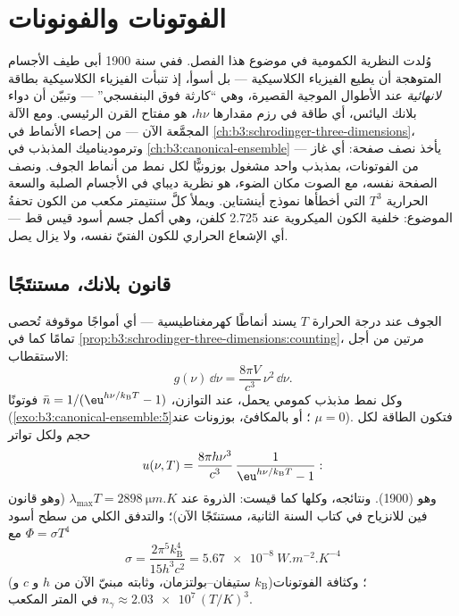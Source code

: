 \chapter{الفوتونات والفونونات}\label{ch:b3:photons-phonons}

وُلدت النظرية الكمومية في موضوع هذا الفصل. ففي سنة 1900 أبى
طيف الأجسام المتوهجة أن يطيع الفيزياء الكلاسيكية ---
بل أسوأ، إذ تنبأت الفيزياء الكلاسيكية بطاقة \emph{لانهائية} عند
الأطوال الموجية القصيرة، وهي ``كارثة فوق البنفسجي'' --- وتبيّن أن دواء بلانك
اليائس، أي طاقة في رزم مقدارها $h\nu$، هو
مفتاح القرن الرئيسي. ومع الآلة المجمَّعة الآن --- من إحصاء
الأنماط في \cref{ch:b3:schrodinger-three-dimensions}، وترموديناميك
المذبذب في \cref{ch:b3:canonical-ensemble} --- يأخذ 
نصف صفحة: أي غاز من الفوتونات، بمذبذب واحد مشغول بوزونيًّا
لكل نمط من أنماط الجوف. ونصف الصفحة نفسه، مع الصوت مكان الضوء،
هو نظرية ديباي في الأجسام الصلبة والسعة الحرارية $T^3$ التي أخطأها
نموذج أينشتاين. ويملأ كلَّ سنتيمتر مكعب من الكون
تحفةُ الموضوع: خلفية الكون الميكروية عند 2.725 كلفن،
وهي أكمل جسم أسود قيس قط --- أي
الإشعاع الحراري للكون الفتيّ نفسه، ولا يزال يصل.

\section{قانون بلانك، مستنتَجًا}

\begin{theorem}\label{thm:b3:photons-phonons:planck}
الجوف عند درجة الحرارة $T$ يسند أنماطًا كهرمغناطيسية ---
أي أمواجًا موقوفة تُحصى تمامًا كما في
\cref{prop:b3:schrodinger-three-dimensions:counting}، مرتين من أجل
الاستقطاب:
\[
g(\nu)\,\dd\nu = \frac{8\pi V}{c^3}\,\nu^2\,\dd\nu .
\]
وكل نمط مذبذب كمومي يحمل، عند التوازن،
$\bar n = 1/(\eu^{h\nu/k_{\text{B}}T} - 1)$ فوتونًا
(\cref{exo:b3:canonical-ensemble:5}؛ أو بالمكافئ، بوزونات عند $\mu =
0$). فتكون الطاقة لكل حجم ولكل تواتر
\[
u(\nu, T) = \frac{8\pi h\nu^3}{c^3}\,
\frac{1}{\eu^{h\nu/k_{\text{B}}T} - 1} :
\]
وهو \emph{} (1900). ونتائجه، وكلها كما قيست:
الذروة عند $\lambda_{\max}T = \qty{2898}{\micro m.K}$ (وهو قانون
فين للانزياح في كتاب السنة الثانية، مستنتَجًا الآن)؛ والتدفق الكلي
من سطح أسود $\Phi = \sigma T^4$ مع
\[
\sigma = \frac{2\pi^5k_{\text{B}}^4}{15h^3c^2}
 = \qty{5.67e-8}{W.m^{-2}.K^{-4}}
\]
(ستيفان--بولتزمان، وثابته مبنيّ الآن من $h$ و $c$ و
$k_{\text{B}}$)؛ وكثافة الفوتونات $n_\gamma \approx
\num{2.03e7}\,(T/\unit{K})^3$ في المتر المكعب.
\end{theorem}

